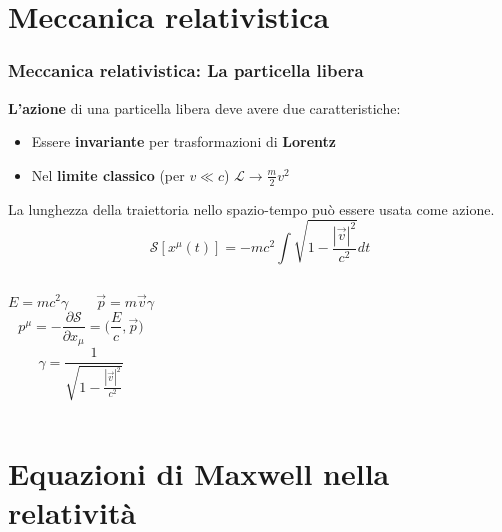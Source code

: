 \documentclass{beamer}
\begin{document}
\section*{Meccanica relativistica}
\begin{frame}
    \frametitle{Meccanica relativistica: La particella libera}
    \textbf{L'azione} di una particella libera deve avere due caratteristiche:
    \begin{itemize}
        \item Essere \textbf{invariante} per trasformazioni di \textbf{Lorentz}
        \item Nel \textbf{limite classico} (per $v\ll c$) $\mathcal{L} \rightarrow \frac{m}{2}v^2$
    \end{itemize}
    La lunghezza della traiettoria nello spazio-tempo può essere usata come azione.
    \begin{equation*}
            \boxed{\mathcal{S}[x^\mu(t)] =-mc^2\int\sqrt{1-\frac{|\vec v|^2}{c^2}} dt}
        \end{equation*}
    \begin{columns}
        \begin{equation*}
            E=mc^2\gamma\qquad\vec p=m\vec v\gamma
        \end{equation*}
        \begin{equation*}
            p^\mu=-\frac{\partial \mathcal{S} }{\partial x_\mu}=\bigg(\frac{E}{c},\vec p\bigg)
        \end{equation*}
        \vspace*{3mm}
        \begin{equation*}
            \gamma=\frac{1}{\sqrt{1-\frac{|\vec v|^2}{c^2}}}
        \end{equation*}
    \end{columns}
\end{frame}

\section*{Equazioni di Maxwell nella relatività}
\end{document}
